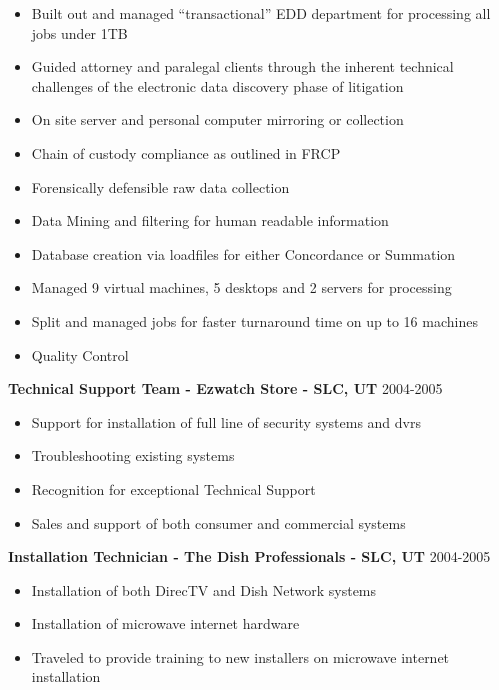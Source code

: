 \documentclass[line,margin]{res}
\begin{document}
\begin{resume}
  \begin{itemize} \itemsep -2pt
  \item Built out and managed “transactional” EDD department for processing all jobs under 1TB
  \item Guided attorney and paralegal clients through the inherent technical challenges of the electronic data discovery phase of litigation
  \item On site server and personal computer mirroring or collection
  \item Chain of custody compliance as outlined in FRCP
  \item Forensically defensible raw data collection 
  \item Data Mining and filtering for human readable information
  \item Database creation via loadfiles for either Concordance or Summation
  \item Managed 9 virtual machines, 5 desktops and 2 servers for processing 
  \item Split and managed jobs for faster turnaround time on up to 16 machines
  \item Quality Control
  \end{itemize}
{\bf Technical Support Team - Ezwatch Store - SLC, UT} \hfill 2004-2005\\
  \begin{itemize} \itemsep -2pt
  \item Support for installation of full line of security systems and dvrs
  \item Troubleshooting existing systems
  \item Recognition for exceptional Technical Support
  \item Sales and support of both consumer and commercial systems
  \end{itemize} 
{\bf Installation Technician - The Dish Professionals - SLC, UT} \hfill 2004-2005\\
  \begin{itemize} \itemsep -2pt
  \item Installation of both DirecTV and Dish Network systems
  \item Installation of microwave internet hardware
  \item Traveled to provide training to new installers on microwave internet installation
  \end{itemize} 	

\end{resume}
\end{document}
